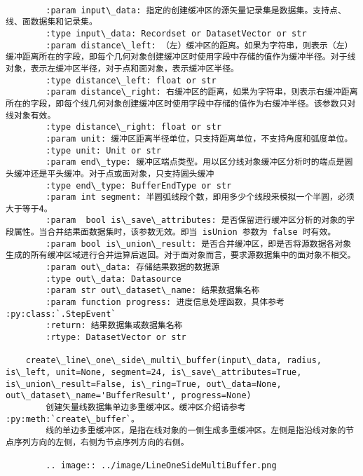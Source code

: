 \documentclass[11pt]{article}
\begin{document}
\begin{Verbatim}[commandchars=\\\{\}]
        
        :param input\_data: 指定的创建缓冲区的源矢量记录集是数据集。支持点、线、面数据集和记录集。
        :type input\_data: Recordset or DatasetVector or str
        :param distance\_left: （左）缓冲区的距离。如果为字符串，则表示（左）缓冲距离所在的字段，即每个几何对象创建缓冲区时使用字段中存储的值作为缓冲半径。对于线对象，表示左缓冲区半径，对于点和面对象，表示缓冲区半径。
        :type distance\_left: float or str
        :param distance\_right: 右缓冲区的距离，如果为字符串，则表示右缓冲距离所在的字段，即每个线几何对象创建缓冲区时使用字段中存储的值作为右缓冲半径。该参数只对线对象有效。
        :type distance\_right: float or str
        :param unit: 缓冲区距离半径单位，只支持距离单位，不支持角度和弧度单位。
        :type unit: Unit or str
        :param end\_type: 缓冲区端点类型。用以区分线对象缓冲区分析时的端点是圆头缓冲还是平头缓冲。对于点或面对象，只支持圆头缓冲
        :type end\_type: BufferEndType or str
        :param int segment: 半圆弧线段个数，即用多少个线段来模拟一个半圆，必须大于等于4。
        :param  bool is\_save\_attributes: 是否保留进行缓冲区分析的对象的字段属性。当合并结果面数据集时，该参数无效。即当 isUnion 参数为 false 时有效。
        :param bool is\_union\_result: 是否合并缓冲区，即是否将源数据各对象生成的所有缓冲区域进行合并运算后返回。对于面对象而言，要求源数据集中的面对象不相交。
        :param out\_data: 存储结果数据的数据源
        :type out\_data: Datasource
        :param str out\_dataset\_name: 结果数据集名称
        :param function progress: 进度信息处理函数，具体参考 :py:class:`.StepEvent`
        :return: 结果数据集或数据集名称
        :rtype: DatasetVector or str
    
    create\_line\_one\_side\_multi\_buffer(input\_data, radius, is\_left, unit=None, segment=24, is\_save\_attributes=True, is\_union\_result=False, is\_ring=True, out\_data=None, out\_dataset\_name='BufferResult', progress=None)
        创建矢量线数据集单边多重缓冲区。缓冲区介绍请参考 :py:meth:`create\_buffer`。
        线的单边多重缓冲区，是指在线对象的一侧生成多重缓冲区。左侧是指沿线对象的节点序列方向的左侧，右侧为节点序列方向的右侧。
        
        .. image:: ../image/LineOneSideMultiBuffer.png
        

\end{Verbatim}
\end{document}
